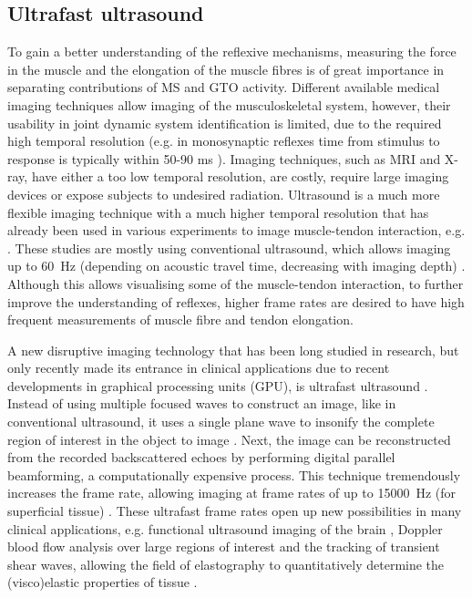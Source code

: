 \subsection*{Ultrafast ultrasound}
To gain a better understanding of the reflexive mechanisms, measuring the force in the muscle and the elongation of the muscle fibres is of great importance in separating contributions of MS and GTO activity. Different available medical imaging techniques allow imaging of the musculoskeletal system, however, their usability in joint dynamic system identification is limited, due to the required high temporal resolution (e.g. in monosynaptic reflexes time from stimulus to response is typically within 50-90 \si{\milli\second} \cite{latash_6_2016}). Imaging techniques, such as MRI and X-ray, have either a too low temporal resolution, are costly, require large imaging devices or expose subjects to undesired radiation. Ultrasound is a much more flexible imaging technique with a much higher temporal resolution that has already been used in various experiments to image muscle-tendon interaction, e.g. \cite{klint_afferent_2009, cronin_automatic_2011}. These studies are mostly using conventional ultrasound, which allows imaging up to \SI{60}{\hertz} (depending on acoustic travel time, decreasing with imaging depth) \cite{minin_ultrafast_2011}. Although this allows visualising some of the muscle-tendon interaction, to further improve the understanding of reflexes, higher frame rates are desired to have high frequent measurements of muscle fibre and tendon elongation. 

A new disruptive imaging technology that has been long studied in research, but only recently made its entrance in clinical applications due to recent developments in graphical processing units (GPU), is ultrafast ultrasound \cite{tanter_ultrafast_2014}. Instead of using multiple focused waves to construct an image, like in conventional ultrasound, it uses a single plane wave to insonify the complete region of interest in the object to image \cite{tanter_ultrafast_2014}. Next, the image can be reconstructed from the recorded backscattered echoes by performing digital parallel beamforming, a computationally expensive process. This technique tremendously increases the frame rate, allowing imaging at frame rates of up to \SI{15000}{\hertz} (for superficial tissue) \cite{minin_ultrafast_2011}. These ultrafast frame rates open up new possibilities in many clinical applications, e.g. functional ultrasound imaging of the brain \cite{mace_functional_2011}, Doppler blood flow analysis over large regions of interest \cite{bercoff_ultrafast_2011} and  the tracking of transient shear waves, allowing the field of elastography to quantitatively determine the (visco)elastic properties of tissue \cite{bercoff_supersonic_2004}. 

